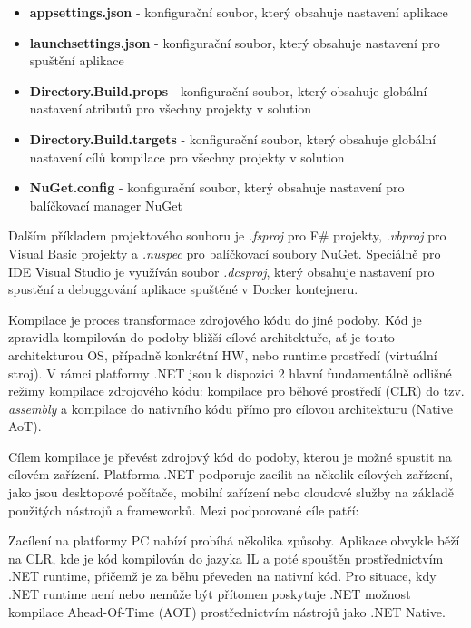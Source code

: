 \begin{itemize}
    \item \textbf{appsettings.json} - konfigurační soubor, který obsahuje nastavení aplikace
    \item \textbf{launchsettings.json} - konfigurační soubor, který obsahuje nastavení pro spuštění aplikace
    \item \textbf{Directory.Build.props} - konfigurační soubor, který obsahuje globální nastavení atributů pro všechny projekty v solution
    \item \textbf{Directory.Build.targets} - konfigurační soubor, který obsahuje globální nastavení cílů kompilace pro všechny projekty v solution
    \item \textbf{NuGet.config} - konfigurační soubor, který obsahuje nastavení pro balíčkovací manager NuGet
    

\end{itemize}

Dalším příkladem projektového souboru je \emph{.fsproj} pro F\# projekty, \emph{.vbproj} pro Visual Basic projekty a \emph{.nuspec} pro balíčkovací soubory NuGet. Speciálně pro IDE Visual Studio je využíván soubor \emph{.dcsproj}, který obsahuje nastavení pro spustění a debuggování aplikace spuštěné v Docker kontejneru. 


Kompilace je proces transformace zdrojového kódu do jiné podoby. Kód je zpravidla kompilován do podoby bližší cílové architektuře, ať je touto architekturou OS, případně konkrétní HW, nebo runtime prostředí (virtuální stroj). V rámci platformy .NET jsou k dispozici 2 hlavní fundamentálně odlišné režimy kompilace zdrojového kódu: kompilace pro běhové prostředí (CLR) do tzv. \emph{assembly} a kompilace do nativního kódu přímo pro cílovou architekturu (Native AoT).


Cílem kompilace je převést zdrojový kód do podoby, kterou je možné spustit na cílovém zařízení. Platforma .NET podporuje zacílit na několik cílových zařízení, jako jsou desktopové počítače, mobilní zařízení nebo cloudové služby na základě použitých nástrojů a frameworků. Mezi podporované cíle patří:


Zacílení na platformy PC nabízí probíhá několika způsoby. Aplikace obvykle běží na CLR, kde je kód kompilován do jazyka IL a poté spouštěn prostřednictvím .NET runtime, přičemž je za běhu převeden na nativní kód. Pro situace, kdy .NET runtime není nebo nemůže být přítomen poskytuje .NET možnost kompilace Ahead-Of-Time (AOT) prostřednictvím nástrojů jako .NET Native.

